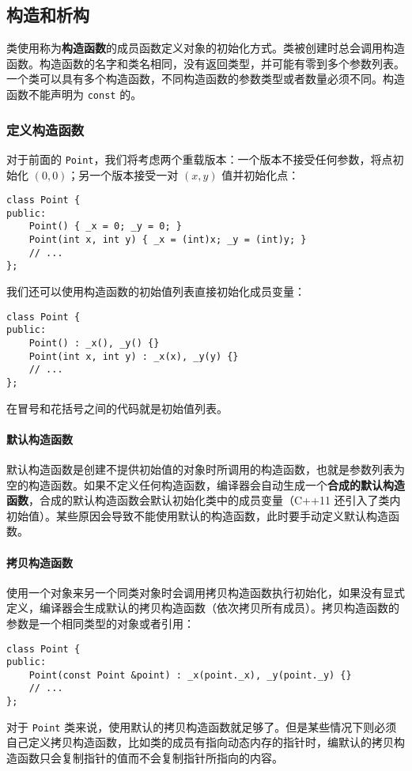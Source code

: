 \documentclass[hyperref,UTF8]{article}
\begin{document}
\subsection{构造和析构} \label{sec:constructor}

类使用称为\textbf{构造函数}的成员函数定义对象的初始化方式。类被创建时总会调用构造函数。构造函数的名字和类名相同，没有返回类型，并可能有零到多个参数列表。一个类可以具有多个构造函数，不同构造函数的参数类型或者数量必须不同。构造函数不能声明为 \texttt{const} 的。

\subsubsection{定义构造函数}

对于前面的 \texttt{Point}，我们将考虑两个重载版本：一个版本不接受任何参数，将点初始化 $(0,0)$；另一个版本接受一对 $(x,y)$ 值并初始化点：
\begin{lstlisting}
class Point {
public:
    Point() { _x = 0; _y = 0; }
    Point(int x, int y) { _x = (int)x; _y = (int)y; }
    // ...
};
\end{lstlisting}
我们还可以使用构造函数的初始值列表直接初始化成员变量：
\begin{lstlisting}
class Point {
public:
    Point() : _x(), _y() {}
    Point(int x, int y) : _x(x), _y(y) {}
    // ...
};
\end{lstlisting}
在冒号和花括号之间的代码就是初始值列表。

\paragraph{默认构造函数} \label{sec:default_constructor}

默认构造函数是创建不提供初始值的对象时所调用的构造函数，也就是参数列表为空的构造函数。如果不定义任何构造函数，编译器会自动生成一个\textbf{合成的默认构造函数}，合成的默认构造函数会默认初始化类中的成员变量（C++11 还引入了类内初始值）。某些原因会导致不能使用默认的构造函数，此时要手动定义默认构造函数。

\paragraph{拷贝构造函数}

使用一个对象来另一个同类对象时会调用拷贝构造函数执行初始化，如果没有显式定义，编译器会生成默认的拷贝构造函数（依次拷贝所有成员）。拷贝构造函数的参数是一个相同类型的对象或者引用：
\begin{lstlisting}
class Point {
public:
    Point(const Point &point) : _x(point._x), _y(point._y) {}
    // ...
};
\end{lstlisting}
对于 \texttt{Point} 类来说，使用默认的拷贝构造函数就足够了。但是某些情况下则必须自己定义拷贝构造函数，比如类的成员有指向动态内存的指针时，编默认的拷贝构造函数只会复制指针的值而不会复制指针所指向的内容。
\end{document}

